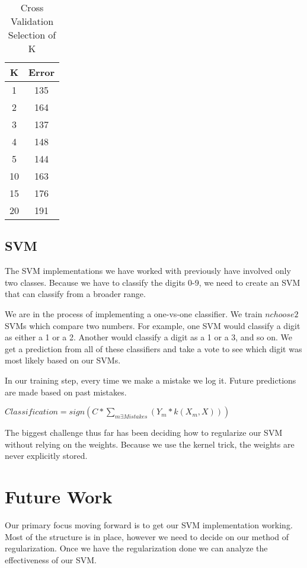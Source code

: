 \documentclass{article} %
\begin{document}
\begin{table}[ht]
\caption{Cross Validation Selection of K} %
\centering  %
\begin{tabular}{c c} 
\hline\hline
K & Error \\ [1.0ex]
\hline 
1 & 135 \\
2 & 164 \\
3 & 137 \\
4 & 148 \\
5 & 144 \\
10 & 163 \\
15 & 176 \\
20 & 191 \\ [1ex]
\hline
\end{tabular}
\label{table:nonlin}
\end{table}

\subsection{SVM}

The SVM implementations we have worked with previously have involved only two classes. Because we have to classify the digits 0-9, we need to create an SVM that can classify from a broader range. 

We are in the process of implementing a one-vs-one classifier. We train $n choose 2$ SVMs which compare two numbers. For example, one SVM would classify a digit as either a 1 or a 2. Another would classify a digit as a 1 or a 3, and so on. We get a prediction from all of these classifiers and take a vote to see which digit was most likely based on our SVMs. 

In our training step, every time we make a mistake we log it. Future predictions are made based on past mistakes.

\begin{center}
$Classification = sign(C * \sum\limits_{m \exists Mistakes} {(Y_m * k(X_m, X))})$
\end{center}

The biggest challenge thus far has been deciding how to regularize our SVM without relying on the weights. Because we use the kernel trick, the weights are never explicitly stored. 

\section{Future Work}

Our primary focus moving forward is to get our SVM implementation working. Most of the structure is in place, however we need to decide on our method of regularization. Once we have the regularization done we can analyze the effectiveness of our SVM.
\end{document}
